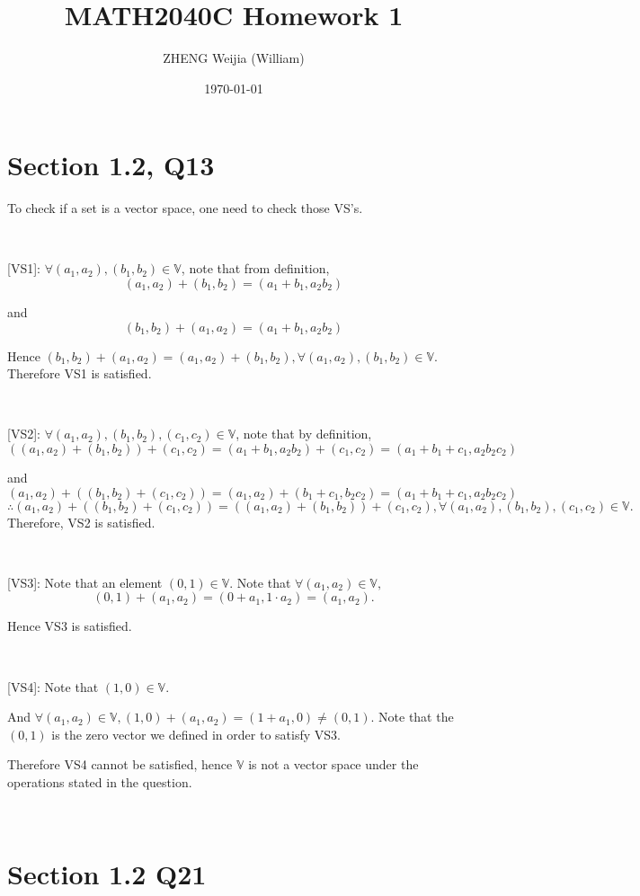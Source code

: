 \documentclass[12pt]{article}%
\begin{document}
\title{MATH2040C Homework 1}
\author{ZHENG Weijia (William)}
\date{\today}
\maketitle

\section{Section 1.2, Q13}

To check if a set is a vector space, one need to check those VS's. 

~\

[VS1]: $\forall (a_1,a_2),(b_1,b_2) \in \mathbb{V}$, note that from definition, $$(a_1,a_2)+(b_1,b_2)=(a_1+b_1,a_2b_2)$$ 

and $$(b_1,b_2)+(a_1,a_2)=(a_1+b_1,a_2b_2)$$

Hence $(b_1,b_2)+(a_1,a_2) = (a_1,a_2)+(b_1,b_2), \forall (a_1,a_2),(b_1,b_2) \in \mathbb{V}.$ Therefore VS1 is satisfied.

~\

[VS2]: $\forall (a_1,a_2),(b_1,b_2),(c_1,c_2) \in \mathbb{V}$, note that by definition, $$((a_1,a_2)+(b_1,b_2))+(c_1,c_2)=(a_1+b_1,a_2b_2)+(c_1,c_2)=(a_1+b_1+c_1,a_2b_2c_2)$$

and $$(a_1,a_2)+((b_1,b_2)+(c_1,c_2)) = (a_1,a_2)+(b_1+c_1,b_2c_2)=(a_1+b_1+c_1,a_2b_2c_2)$$ $$\therefore (a_1,a_2)+((b_1,b_2)+(c_1,c_2)) = ((a_1,a_2)+(b_1,b_2))+(c_1,c_2), \forall (a_1,a_2),(b_1,b_2),(c_1,c_2) \in \mathbb{V}.$$ Therefore, VS2 is satisfied.

~\

[VS3]: Note that an element $(0,1)\in \mathbb{V}.$ Note that $\forall (a_1,a_2)\in \mathbb{V},$ $$(0,1)+(a_1,a_2)=(0+a_1,1\cdot a_2) = (a_1,a_2).$$

Hence VS3 is satisfied. 

~\

[VS4]: Note that $(1,0)\in \mathbb{V}.$ 

And $\forall (a_1,a_2)\in \mathbb{V}, (1,0)+(a_1,a_2)=(1+a_1,0)\neq (0,1).$ Note that the $(0,1)$ is the zero vector we defined in order to satisfy VS3.

Therefore VS4 cannot be satisfied, hence $\mathbb{V}$ is not a vector space under the operations stated in the question.

~\

\section{Section 1.2 Q21}
\end{document}
